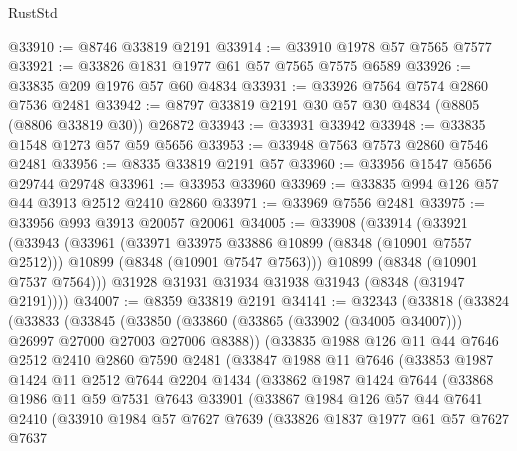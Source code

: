 \begin{lexlean}{RustStd}
\begin{coremodule}
@33910 := @8746 @33819 @2191
@33914 := @33910 @1978 @57 @7565 @7577
@33921 := @33826 @1831 @1977 @61 @57 @7565 @7575 @6589
@33926 := @33835 @209 @1976 @57 @60 @4834
@33931 := @33926 @7564 @7574 @2860 @7536 @2481
@33942 := @8797 @33819 @2191 @30 @57 @30 @4834 (@8805 (@8806 @33819 @30)) @26872
@33943 := @33931 @33942
@33948 := @33835 @1548 @1273 @57 @59 @5656
@33953 := @33948 @7563 @7573 @2860 @7546 @2481
@33956 := @8335 @33819 @2191 @57
@33960 := @33956 @1547 @5656 @29744 @29748
@33961 := @33953 @33960
@33969 := @33835 @994 @126 @57 @44 @3913 @2512 @2410 @2860
@33971 := @33969 @7556 @2481
@33975 := @33956 @993 @3913 @20057 @20061
@34005 := @33908
    (@33914
      (@33921
        (@33943
          (@33961
            (@33971 @33975 @33886 @10899 (@8348 (@10901 @7557 @2512)))
            @10899
            (@8348 (@10901 @7547 @7563)))
          @10899
          (@8348 (@10901 @7537 @7564)))
        @31928
        @31931
        @31934
        @31938
        @31943
        (@8348 (@31947 @2191))))
@34007 := @8359 @33819 @2191
@34141 := @32343
    (@33818
      (@33824
        (@33833
          (@33845
            (@33850 (@33860 (@33865 (@33902 (@34005 @34007))) @26997 @27000 @27003 @27006 @8388))
            (@33835
              @1988
              @126
              @11
              @44
              @7646
              @2512
              @2410
              @2860
              @7590
              @2481
              (@33847
                @1988
                @11
                @7646
                (@33853
                  @1987
                  @1424
                  @11
                  @2512
                  @7644
                  @2204
                  @1434
                  (@33862
                    @1987
                    @1424
                    @7644
                    (@33868
                      @1986
                      @11
                      @59
                      @7531
                      @7643
                      @33901
                      (@33867
                        @1984
                        @126
                        @57
                        @44
                        @7641
                        @2410
                        (@33910
                          @1984
                          @57
                          @7627
                          @7639
                          (@33826
                            @1837
                            @1977
                            @61
                            @57
                            @7627
                            @7637

\end{coremodule}
\end{lexlean}
